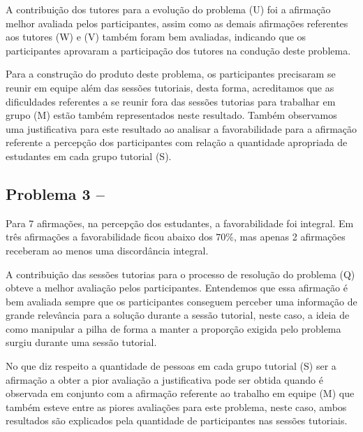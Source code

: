 A contribuição dos tutores para a evolução do problema (U) foi a
afirmação melhor avaliada pelos participantes, assim como as demais
afirmações referentes aos tutores (W) e (V) também foram bem avaliadas,
indicando que os participantes aprovaram a participação
dos tutores na condução deste problema.

Para a construção do produto deste problema, os participantes
precisaram se reunir em equipe além das sessões tutoriais, desta forma,
acreditamos que as dificuldades referentes a se reunir fora das sessões tutorias
para trabalhar em grupo (M) estão também representados neste resultado.
Também observamos uma justificativa para este resultado ao analisar a favorabilidade para
a afirmação referente a percepção dos participantes com relação a quantidade
apropriada de estudantes em cada grupo tutorial (S).


\subsection{Problema 3 -- \ProblemaC}

Para 7 afirmações, na percepção dos estudantes, a favorabilidade foi integral.
Em três afirmações a favorabilidade ficou abaixo dos $70\%$, mas apenas 2
afirmações receberam ao menos uma discordância integral.

A contribuição das sessões tutorias para o processo
de resolução do problema (Q) obteve a melhor avaliação pelos
participantes.
Entendemos que essa afirmação é bem avaliada sempre que
os participantes conseguem perceber uma informação de
grande relevância para a solução durante a sessão
tutorial, neste caso, a ideia de como manipular a pilha
de forma a manter a proporção exigida pelo problema
surgiu durante uma sessão tutorial.

No que diz respeito a quantidade de pessoas em
cada grupo tutorial (S) ser a afirmação a obter a pior
avaliação a justificativa pode ser obtida quando
é observada em conjunto com a afirmação referente ao
trabalho em equipe (M) que também esteve entre
as piores avaliações para este problema, neste caso,
ambos resultados são explicados pela quantidade de
participantes nas sessões tutoriais.


